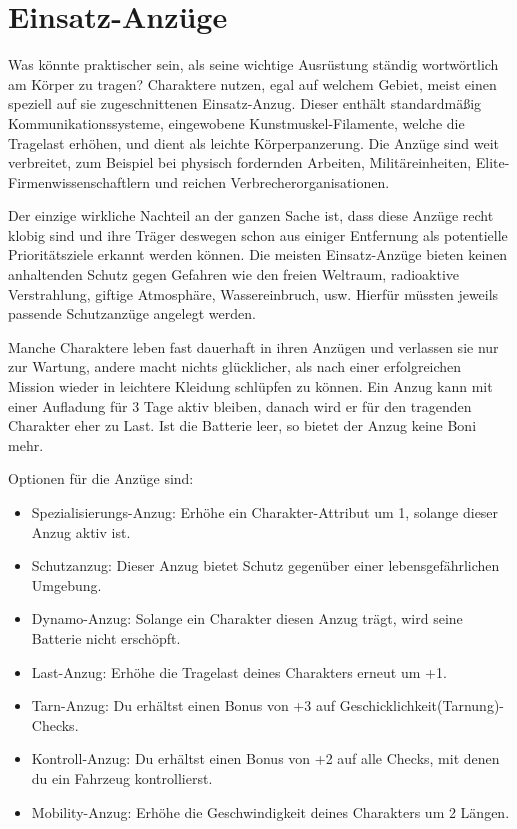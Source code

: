 \section{Einsatz-Anzüge}
Was könnte praktischer sein, als seine wichtige Ausrüstung ständig wortwörtlich am Körper zu tragen? Charaktere nutzen, egal auf welchem Gebiet, meist einen speziell auf sie zugeschnittenen Einsatz-Anzug. Dieser enthält standardmäßig Kommunikationssysteme, eingewobene Kunstmuskel-Filamente, welche die Tragelast erhöhen, und dient als leichte Körperpanzerung. Die Anzüge sind weit verbreitet, zum Beispiel bei physisch fordernden Arbeiten, Militäreinheiten, Elite-Firmenwissenschaftlern und reichen Verbrecherorganisationen.

Der einzige wirkliche Nachteil an der ganzen Sache ist, dass diese Anzüge recht klobig sind und ihre Träger deswegen schon aus einiger Entfernung als potentielle Prioritätsziele erkannt werden können. Die meisten Einsatz-Anzüge bieten keinen anhaltenden Schutz gegen Gefahren wie den freien Weltraum, radioaktive Verstrahlung, giftige Atmosphäre, Wassereinbruch, usw. Hierfür müssten jeweils passende Schutzanzüge angelegt werden.

Manche Charaktere leben fast dauerhaft in ihren Anzügen und verlassen sie nur zur Wartung, andere macht nichts glücklicher, als nach einer erfolgreichen Mission wieder in \glqq leichtere\grqq{} Kleidung schlüpfen zu können. Ein Anzug kann mit einer Aufladung für 3 Tage aktiv bleiben, danach wird er für den tragenden Charakter eher zu Last. Ist die Batterie leer, so bietet der Anzug keine Boni mehr.

Optionen für die Anzüge sind:
\begin{itemize}
\itemsep0pt
\item Spezialisierungs-Anzug: Erhöhe ein Charakter-Attribut um 1, solange dieser Anzug aktiv ist.
\item Schutzanzug: Dieser Anzug bietet Schutz gegenüber einer lebensgefährlichen Umgebung.
\item Dynamo-Anzug: Solange ein Charakter diesen Anzug trägt, wird seine Batterie nicht erschöpft.
\item Last-Anzug: Erhöhe die Tragelast deines Charakters erneut um +1.
\item Tarn-Anzug: Du erhältst einen Bonus von +3 auf Geschicklichkeit(Tarnung)-Checks.
\item Kontroll-Anzug: Du erhältst einen Bonus von +2 auf alle Checks, mit denen du ein Fahrzeug kontrollierst.
\item Mobility-Anzug: Erhöhe die Geschwindigkeit deines Charakters um 2 Längen.
\end{itemize}

